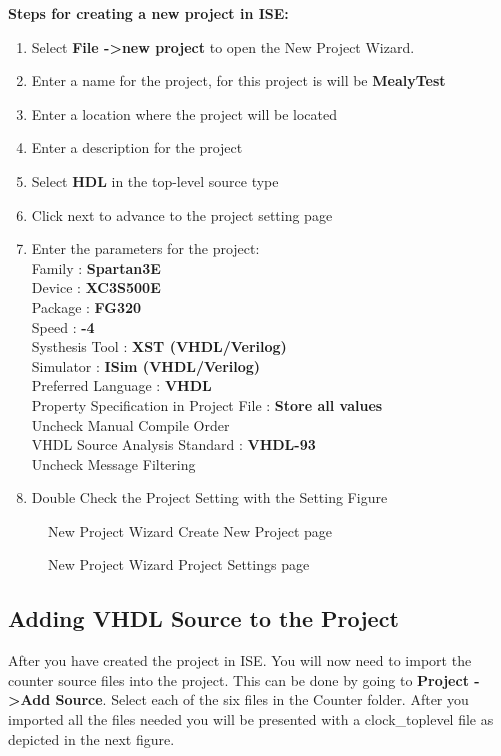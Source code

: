 \documentclass{article}
\begin{document}
\textbf{Steps for creating a new project in ISE:}
\begin{enumerate}
  \item Select \textbf{File -\textgreater new project} to open the New Project Wizard.
  \item Enter a name for the project, for this project is will be \textbf{MealyTest}
  \item Enter a location where the project will be located
  \item Enter a description for the project
  \item Select \textbf{HDL} in the top-level source type
  \item Click next to advance to the project setting page
  \item Enter the parameters for the project: \hfill \\
  Family : \textbf{Spartan3E}\\
  Device : \textbf{XC3S500E}\\
  Package : \textbf{FG320}\\
  Speed  : \textbf{-4}\\
  Systhesis Tool : \textbf{XST (VHDL/Verilog)}\\
  Simulator : \textbf{ISim (VHDL/Verilog)}\\
  Preferred Language : \textbf{VHDL}\\
  Property Specification in Project File : \textbf{Store all values}\\
  Uncheck Manual Compile Order\\
  VHDL Source Analysis Standard : \textbf{VHDL-93}\\
  Uncheck Message Filtering
  \item Double Check the Project Setting with the Setting Figure
\end{enumerate}

\newpage %

\begin{figure}[!htb]
  \centering
  \caption{New Project Wizard Create New Project page}
\end{figure}

\begin{figure}[!htb]
  \centering
  \caption{New Project Wizard Project Settings page}
\end{figure}

\subsection{Adding VHDL Source to the Project}
After you have created the project in ISE. You will now need to import the counter source files into the project. This can be done by going to \textbf{Project -\textgreater Add Source}. Select each of the six files in the Counter folder. After you imported all the files needed you will be presented with a clock\_toplevel file as depicted in the next figure.
\end{document}

